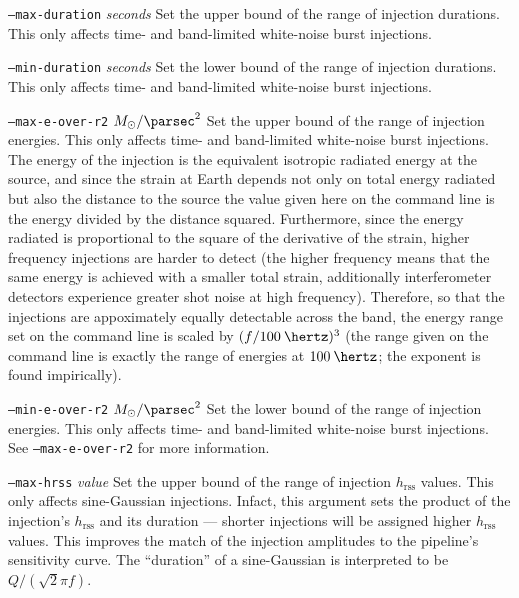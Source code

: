 \documentclass[10pt]{article}
\newcommand{\option}[1]{\texttt{#1}}
\newcommand{\parm}[1]{\textit{#1}}
\newenvironment{entry}%
{\begin{list}{}{\renewcommand{\makelabel}[1]%
{\parbox[b]{\labelwidth}{\makebox[0pt][l]{\textbf{##1}}\\}}%
\setlength{\labelwidth}{1em}%
\setlength{\labelsep}{1em}%
\setlength{\leftmargin}{2em}%
\setlength{\topsep}{\medskipamount}%
\setlength{\itemsep}{\medskipamount}%
\setlength{\parsep}{\medskipamount}%
\setlength{\listparindent}{0pt}}}
{\end{list}}
\begin{document}
\begin{entry}
\begin{entry}
\item[\option{--max-duration} \parm{seconds}]
Set the upper bound of the range of injection durations.  This only affects
time- and band-limited white-noise burst injections.

\item[\option{--min-duration} \parm{seconds}]
Set the lower bound of the range of injection durations.  This only affects
time- and band-limited white-noise burst injections.

\item[\option{--max-e-over-r2} \parm{\(\Msol / \text{\parsec}^{2}\)}]
Set the upper bound of the range of injection energies.  This only affects
time- and band-limited white-noise burst injections.  The energy of the
injection is the equivalent isotropic radiated energy at the source, and
since the strain at Earth depends not only on total energy radiated but
also the distance to the source the value given here on the command line is
the energy divided by the distance squared.  Furthermore, since the energy
radiated is proportional to the square of the derivative of the strain,
higher frequency injections are harder to detect (the higher frequency
means that the same energy is achieved with a smaller total strain,
additionally interferometer detectors experience greater shot noise at high
frequency).  Therefore, so that the injections are appoximately equally
detectable across the band, the energy range set on the command line is
scaled by \((f / \unit{100}{\hertz})^{3}\) (the range given on the command
line is exactly the range of energies at \(\unit{100}{\hertz}\);  the
exponent is found impirically).

\item[\option{--min-e-over-r2} \parm{\(\Msol / \text{\parsec}^{2}\)}]
Set the lower bound of the range of injection energies.  This only affects
time- and band-limited white-noise burst injections.  See
\option{--max-e-over-r2} for more information.

\item[\option{--max-hrss} \parm{value}]
Set the upper bound of the range of injection \(h_{\text{rss}}\) values.
This only affects sine-Gaussian injections.  Infact, this argument sets the
product of the injection's \(h_{\text{rss}}\) and its duration --- shorter
injections will be assigned higher \(h_{\text{rss}}\) values.  This
improves the match of the injection amplitudes to the pipeline's
sensitivity curve.  The ``duration'' of a sine-Gaussian is interpreted to
be \(Q / (\sqrt{2} \pi f)\).


\end{entry}
\end{entry}
\end{document}
